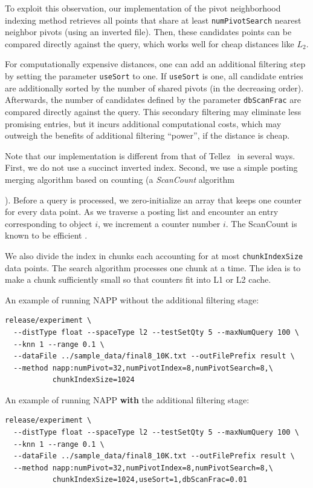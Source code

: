 \documentclass[runningheads,a4paper]{llncs}
\newcommand{\ttt}[1]{\texttt{#1}}
\begin{document}
{To exploit this observation, our implementation of the pivot neighborhood indexing method retrieves all points that 
share at least \ttt{numPivotSearch} nearest neighbor pivots (using an inverted file).
Then, these candidates points can be compared directly against the query,
which works well for cheap distances like $L_2$.

For computationally expensive distances, one can add an additional filtering step by
setting the parameter \ttt{useSort} to one.
If \ttt{useSort} is one, all candidate entries are additionally sorted by the number of shared pivots
(in the decreasing order).
Afterwards, the number of candidates defined by the parameter \ttt{dbScanFrac} are compared directly against the query. 
This secondary filtering may eliminate less promising entries, but it incurs additional
computational costs, which may outweigh the benefits of additional filtering ``power'', if the distance is cheap.

Note that our implementation is different from that of Tellez~\cite{tellez2013succinct} in several ways.
First, we do not use a succinct inverted index. Second, we use a simple posting merging algorithm
based on counting (a \emph{ScanCount} algorithm}). 
Before a query is processed, we zero-initialize an array that keeps one
counter for every data point. As we traverse a posting list and encounter an entry corresponding to object
$i$, we increment a counter number $i$.
The ScanCount is known to be efficient \cite{li2008efficient}.

We also divide the index in chunks each accounting for at most \ttt{chunkIndexSize} data points.
The search algorithm processes one chunk at a time. The idea is to make a chunk sufficiently small
so that counters fit into L1 or L2  cache.

An example of running NAPP without the additional filtering stage:
{
\footnotesize
\begin{verbatim}
release/experiment \
  --distType float --spaceType l2 --testSetQty 5 --maxNumQuery 100 \
  --knn 1 --range 0.1 \
  --dataFile ../sample_data/final8_10K.txt --outFilePrefix result \
  --method napp:numPivot=32,numPivotIndex=8,numPivotSearch=8,\
           chunkIndexSize=1024
\end{verbatim}
}
An example of running NAPP \textbf{with} the additional filtering stage:
{
\footnotesize
\begin{verbatim}
release/experiment \
  --distType float --spaceType l2 --testSetQty 5 --maxNumQuery 100 \
  --knn 1 --range 0.1 \
  --dataFile ../sample_data/final8_10K.txt --outFilePrefix result \
  --method napp:numPivot=32,numPivotIndex=8,numPivotSearch=8,\
           chunkIndexSize=1024,useSort=1,dbScanFrac=0.01
\end{verbatim}
}
\end{document}
